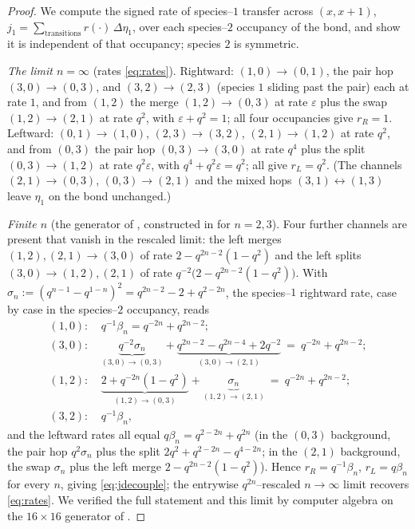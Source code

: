 \documentclass[11pt]{article}
\theoremstyle{plain}
\theoremstyle{definition}
\theoremstyle{remark}
\newcommand{\eps}{\varepsilon}\newcommand{\Exp}{\mathrm{Exp}}
\begin{document}
\begin{proof}
We compute the signed rate of species--$1$ transfer across $(x,x{+}1)$,
$j_1=\sum_{\text{transitions}}r(\cdot)\,\Delta\eta_1$, over each species--$2$ occupancy
of the bond, and show it is independent of that occupancy; species $2$ is symmetric.

\emph{The limit $n=\infty$} \textup{(}rates \eqref{eq:rates}\textup{)}. Rightward:
$(1,0)\!\to\!(0,1)$, the pair hop $(3,0)\!\to\!(0,3)$, and $(3,2)\!\to\!(2,3)$ (species
$1$ sliding past the pair) each at rate $1$, and from $(1,2)$ the merge
$(1,2)\!\to\!(0,3)$ at rate $\eps$ plus the swap $(1,2)\!\to\!(2,1)$ at rate $q^2$, with
$\eps+q^2=1$; all four occupancies give $r_R=1$. Leftward: $(0,1)\!\to\!(1,0)$,
$(2,3)\!\to\!(3,2)$, $(2,1)\!\to\!(1,2)$ at rate $q^2$, and from $(0,3)$ the pair hop
$(0,3)\!\to\!(3,0)$ at rate $q^4$ plus the split $(0,3)\!\to\!(1,2)$ at rate $q^2\eps$,
with $q^4+q^2\eps=q^2$; all give $r_L=q^2$. (The channels $(2,1)\!\to\!(0,3)$,
$(0,3)\!\to\!(2,1)$ and the mixed hops $(3,1)\!\leftrightarrow\!(1,3)$ leave $\eta_1$ on
the bond unchanged.)

\emph{Finite $n$} \textup{(}the generator of \cite[\S2.1]{REU}, constructed in
\cite{KLLPZ} for $n=2,3$\textup{)}. Four further channels are present that vanish in the
rescaled limit: the left merges $(1,2),(2,1)\to(3,0)$ of rate $2-q^{2n-2}(1-q^2)$ and
the left splits $(3,0)\to(1,2),(2,1)$ of rate $q^{-2}\big(2-q^{2n-2}(1-q^2)\big)$. With
$\sigma_n:=(q^{n-1}-q^{1-n})^2=q^{2n-2}-2+q^{2-2n}$, the species--$1$ rightward rate,
case by case in the species--$2$ occupancy, reads
\begin{align*}
  (1,0)\colon&\ q^{-1}\beta_n=q^{-2n}+q^{2n-2};\\
  (3,0)\colon&\ \underbrace{q^{-2}\sigma_n}_{(3,0)\to(0,3)}
    +\underbrace{q^{2n-2}-q^{2n-4}+2q^{-2}}_{(3,0)\to(2,1)}\ =\ q^{-2n}+q^{2n-2};\\
  (1,2)\colon&\ \underbrace{2+q^{-2n}(1-q^2)}_{(1,2)\to(0,3)}
    +\underbrace{\sigma_n}_{(1,2)\to(2,1)}\ =\ q^{-2n}+q^{2n-2};\\
  (3,2)\colon&\ q^{-1}\beta_n,
\end{align*}
and the leftward rates all equal $q\beta_n=q^{2-2n}+q^{2n}$ (in the $(0,3)$ background,
the pair hop $q^2\sigma_n$ plus the split $2q^2+q^{2-2n}-q^{4-2n}$; in the $(2,1)$
background, the swap $\sigma_n$ plus the left merge $2-q^{2n-2}(1-q^2)$). Hence
$r_R=q^{-1}\beta_n$, $r_L=q\beta_n$ for every $n$, giving \eqref{eq:jdecouple}; the
entrywise $q^{2n}$--rescaled $n\to\infty$ limit recovers \eqref{eq:rates}. We verified
the full statement and this limit by computer algebra on the $16\times16$ generator of
\cite[\S2.1]{REU}.


\end{proof}
\end{document}
